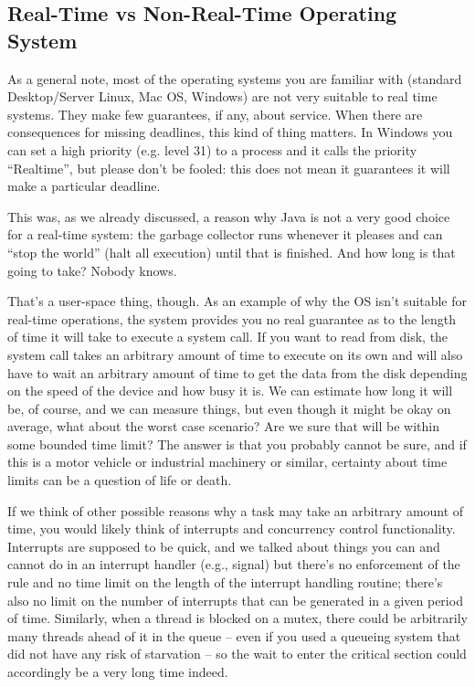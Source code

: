 \subsection*{Real-Time vs Non-Real-Time Operating System}

As a general note, most of the operating systems you are familiar with (standard Desktop/Server Linux, Mac OS, Windows) are not very suitable to real time systems. They make few guarantees, if any, about service. When there are consequences for missing deadlines, this kind of thing matters.  In Windows you can set a high priority (e.g. level 31) to a process and it calls the priority ``Realtime'', but please don't be fooled: this does not mean it guarantees it will make a particular deadline.

This was, as we already discussed, a reason why Java is not a very good choice for a real-time system: the garbage collector runs whenever it pleases and can ``stop the world'' (halt all execution) until that is finished. And how long is that going to take? Nobody knows.

That's a user-space thing, though. As an example of why the OS isn't suitable for real-time operations, the system provides you no real guarantee as to the length of time it will take to execute a system call. If you want to read from disk, the system call takes an arbitrary amount of time to execute on its own and will also have to wait an arbitrary amount of time to get the data from the disk depending on the speed of the device and how busy it is. We can estimate how long it will be, of course, and we can measure things, but even though it might be okay on average, what about the worst case scenario? Are we sure that will be within some bounded time limit? The answer is that you probably cannot be sure, and if this is a motor vehicle or industrial machinery or similar, certainty about time limits can be a question of life or death.

If we think of other possible reasons why a task may take an arbitrary amount of time, you would likely think of interrupts and concurrency control functionality. Interrupts are supposed to be quick, and we talked about things you can and cannot do in an interrupt handler (e.g., signal) but there's no enforcement of the rule and no time limit on the length of the interrupt handling routine; there's also no limit on the number of interrupts that can be generated in a given period of time. Similarly, when a thread is blocked on a mutex, there could be arbitrarily many threads ahead of it in the queue -- even if you used a queueing system that did not have any risk of starvation -- so the wait to enter the critical section could accordingly be a very long time indeed.

